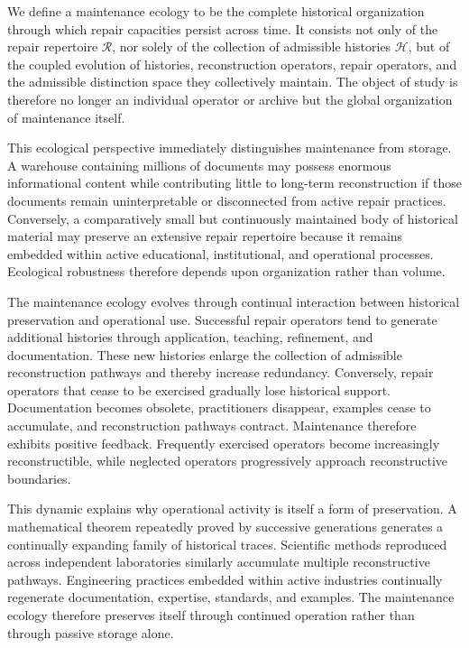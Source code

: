 \documentclass[12pt,oneside]{article}
\theoremstyle{plain}
\theoremstyle{definition}
\theoremstyle{remark}
\theoremstyle{plain}
\newcommand{\Hist}{\mathcal{H}}
\begin{document}
We define a maintenance ecology to be the complete historical organization through which repair
capacities persist across time. It consists not only of the repair repertoire $\mathcal{R}$, nor
solely of the collection of admissible histories $\Hist$, but of the coupled evolution of
histories, reconstruction operators, repair operators, and the admissible distinction space they
collectively maintain. The object of study is therefore no longer an individual operator or archive
but the global organization of maintenance itself.

This ecological perspective immediately distinguishes maintenance from storage. A warehouse
containing millions of documents may possess enormous informational content while contributing
little to long-term reconstruction if those documents remain uninterpretable or disconnected from
active repair practices. Conversely, a comparatively small but continuously maintained body of
historical material may preserve an extensive repair repertoire because it remains embedded within
active educational, institutional, and operational processes. Ecological robustness therefore
depends upon organization rather than volume.

The maintenance ecology evolves through continual interaction between historical preservation and
operational use. Successful repair operators tend to generate additional histories through
application, teaching, refinement, and documentation. These new histories enlarge the collection of
admissible reconstruction pathways and thereby increase redundancy. Conversely, repair operators
that cease to be exercised gradually lose historical support. Documentation becomes obsolete,
practitioners disappear, examples cease to accumulate, and reconstruction pathways contract.
Maintenance therefore exhibits positive feedback. Frequently exercised operators become
increasingly reconstructible, while neglected operators progressively approach reconstructive
boundaries.

This dynamic explains why operational activity is itself a form of preservation. A mathematical
theorem repeatedly proved by successive generations generates a continually expanding family of
historical traces. Scientific methods reproduced across independent laboratories similarly
accumulate multiple reconstructive pathways. Engineering practices embedded within active
industries continually regenerate documentation, expertise, standards, and examples. The maintenance
ecology therefore preserves itself through continued operation rather than through passive storage
alone.
\end{document}
